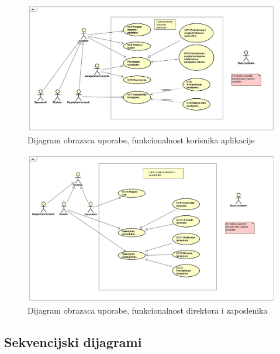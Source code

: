 			\begin{figure}[H]
				\centering
				\includegraphics[width=1.0\linewidth]{slike/Funkcionalnost_korisnika_aplikacije.png}
				\caption{Dijagram obrazaca uporabe, funkcionalnost korisnika aplikacije}
				\label{fig:Funkcionalnost korisnika aplikacije}
			\end{figure}
			
			\clearpage
			
			\eject
			
			\begin{figure}[H]
				\centering
				\includegraphics[width=1.0\linewidth]{slike/Funkcionalnost_direktora_i_zaposlenika.png}
				\caption{Dijagram obrazaca uporabe, funkcionalnost direktora i zaposlenika}
				\label{fig:Funkcionalnost direktora i zaposlenika}
			\end{figure}
			
			\clearpage
			
			\eject		

			\subsection{Sekvencijski dijagrami}
			
